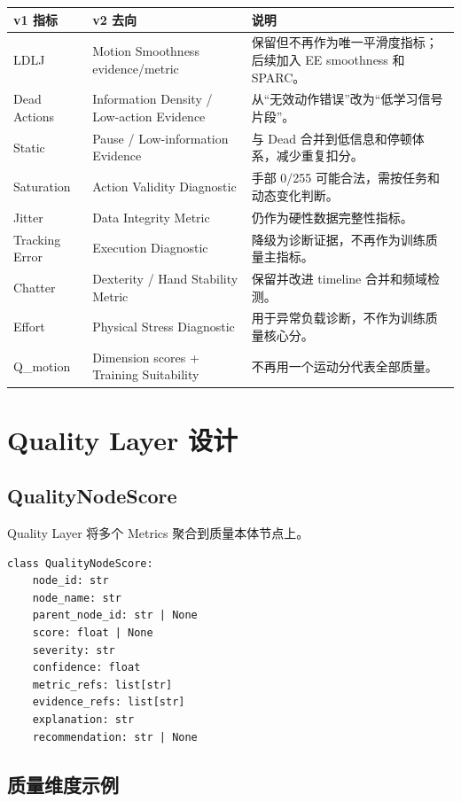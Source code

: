\documentclass[UTF8,zihao=-4]{ctexart}
\begin{document}
\begin{longtable}{L{3.4cm} L{4.4cm} L{5.8cm}}
\toprule
v1 指标 & v2 去向 & 说明 \\
\midrule
LDLJ & Motion Smoothness evidence/metric & 保留但不再作为唯一平滑度指标；后续加入 EE smoothness 和 SPARC。 \\
Dead Actions & Information Density / Low-action Evidence & 从“无效动作错误”改为“低学习信号片段”。 \\
Static & Pause / Low-information Evidence & 与 Dead 合并到低信息和停顿体系，减少重复扣分。 \\
Saturation & Action Validity Diagnostic & 手部 0/255 可能合法，需按任务和动态变化判断。 \\
Jitter & Data Integrity Metric & 仍作为硬性数据完整性指标。 \\
Tracking Error & Execution Diagnostic & 降级为诊断证据，不再作为训练质量主指标。 \\
Chatter & Dexterity / Hand Stability Metric & 保留并改进 timeline 合并和频域检测。 \\
Effort & Physical Stress Diagnostic & 用于异常负载诊断，不作为训练质量核心分。 \\
Q\_motion & Dimension scores + Training Suitability & 不再用一个运动分代表全部质量。 \\
\bottomrule
\end{longtable}

\section{Quality Layer 设计}

\subsection{QualityNodeScore}

Quality Layer 将多个 Metrics 聚合到质量本体节点上。

\begin{verbatim}
class QualityNodeScore:
    node_id: str
    node_name: str
    parent_node_id: str | None
    score: float | None
    severity: str
    confidence: float
    metric_refs: list[str]
    evidence_refs: list[str]
    explanation: str
    recommendation: str | None
\end{verbatim}

\subsection{质量维度示例}
\end{document}
